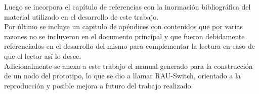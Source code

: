 Luego se incorpora el cap\'itulo de referencias con la inormaci\'on bibliográfica del material utilizado en el desarrollo de este trabajo.\\

Por \'ultimo se incluye un capitulo de ap\'endices con contenidos que por varias razones no se incluyeron en el documento principal y que fueron debidamente referenciados en el desarrollo del mismo para complementar la lectura en caso de que el lector así lo desee.\\

Adicionalmente se anexa a este trabajo el manual generado para la construcci\'on de un nodo del prototipo, lo que se dio a llamar RAU-Switch, orientado a la reproducci\'on y posible mejora a futuro del trabajo realizado.

 
